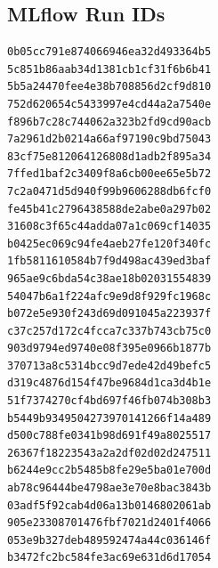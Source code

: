 \documentclass[12pt,a4paper]{article}
\begin{document}
\subsection*{MLflow Run IDs}

\begin{lstlisting}
0b05cc791e874066946ea32d493364b5
5c851b86aab34d1381cb1cf31f6b6b41
5b5a24470fee4e38b708856d2cf9d810
752d620654c5433997e4cd44a2a7540e
f896b7c28c744062a323b2fd9cd90acb
7a2961d2b0214a66af97190c9bd75043
83cf75e812064126808d1adb2f895a34
7ffed1baf2c3409f8a6cb00ee65e5b72
7c2a0471d5d940f99b9606288db6fcf0
fe45b41c2796438588de2abe0a297b02
31608c3f65c44adda07a1c069cf14035
b0425ec069c94fe4aeb27fe120f340fc
1fb5811610584b7f9d498ac439ed3baf
965ae9c6bda54c38ae18b02031554839
54047b6a1f224afc9e9d8f929fc1968c
b072e5e930f243d69d091045a223937f
c37c257d172c4fcca7c337b743cb75c0
903d9794ed9740e08f395e0966b1877b
370713a8c5314bcc9d7ede42d49befc5
d319c4876d154f47be9684d1ca3d4b1e
51f7374270cf4bd697f46fb074b308b3
b5449b9349504273970141266f14a489
d500c788fe0341b98d691f49a8025517
26367f18223543a2a2df02d02d247511
b6244e9cc2b5485b8fe29e5ba01e700d
ab78c96444be4798ae3e70e8bac3843b
03adf5f92cab4d06a13b0146802061ab
905e23308701476fbf7021d2401f4066
053e9b327deb489592474a44c036146f
b3472fc2bc584fe3ac69e631d6d17054
\end{lstlisting}
\end{document}

